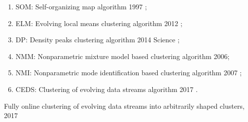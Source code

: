 {\begin{enumerate}[label=\Roman*,align=left]
  \url{http://yarpiz.com/255/ypml110-dbscan-clustering}
  \item SOM: Self-organizing map algorithm 1997 \cite{Kohonen1997-5691};
  \item ELM: Evolving local means clustering algorithm 2012 \cite{RPDutta2012-5681};
  \item DP: Density peaks clustering algorithm 2014 Science \cite{RodriguezLaio2014-5691};
  \item NMM: Nonparametric mixture model based clustering algorithm 2006\cite{Blei2006-5683};
  \item NMI: Nonparametric mode identification based clustering algorithm 2007 \cite{LiRay2007-5690};
  \item CEDS: Clustering of evolving data streams algorithm 2017 \cite{HydeAngelov2017-5682}.
\end{enumerate}

Fully online clustering of evolving data streams into arbitrarily shaped clusters, 2017 \cite{HydeAngelov2017-5682} 

}
